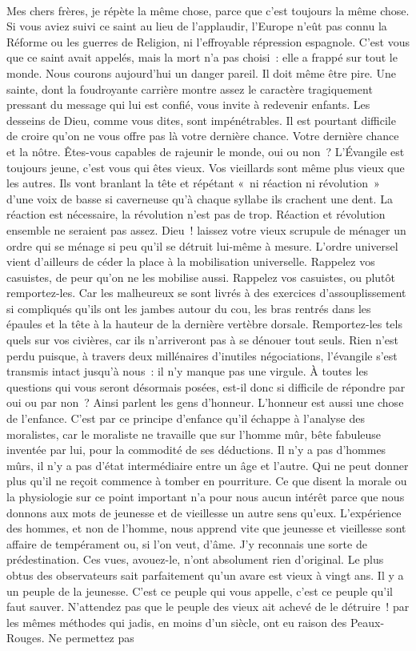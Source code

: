 \documentclass[french,twoside]{book} %
\begin{document}
\noindent  \par
Mes chers frères, je répète la même chose, parce que c’est toujours la même chose. Si vous aviez suivi ce saint au lieu de l’applaudir, l’Europe n’eût pas connu la Réforme ou les guerres de Religion, ni l’effroyable répression espagnole. C’est vous que ce saint avait appelés, mais la mort n’a pas choisi : elle a frappé sur tout le monde. Nous courons aujourd’hui un danger pareil. Il doit même être pire. Une sainte, dont la foudroyante carrière montre assez le caractère tragiquement pressant du message qui lui est confié, vous invite à redevenir enfants. Les desseins de Dieu, comme vous dites, sont impénétrables. Il est pourtant difficile de croire qu’on ne vous offre pas là votre dernière chance. Votre dernière chance et la nôtre. Êtes-vous capables de rajeunir le monde, oui ou non ? L’Évangile est toujours jeune, c’est vous qui êtes vieux. Vos vieillards sont même plus vieux que les autres. Ils vont branlant la tête et répétant « ni réaction ni révolution » d’une voix de basse si caverneuse qu’à chaque syllabe ils crachent une dent. La réaction est nécessaire, la révolution n’est pas de trop. Réaction et révolution ensemble ne seraient pas assez. Dieu ! laissez votre vieux scrupule de ménager un ordre qui se ménage si peu qu’il se détruit lui-même à mesure. L’ordre universel vient d’ailleurs de céder la place à la mobilisation universelle. Rappelez vos casuistes, de peur qu’on ne les mobilise aussi. Rappelez vos casuistes, ou plutôt remportez-les. Car les malheureux se sont livrés à des exercices d’assouplissement si compliqués qu’ils ont les jambes autour du cou, les bras rentrés dans les épaules et la tête à la hauteur de la dernière vertèbre dorsale. Remportez-les tels quels sur vos civières, car ils n’arriveront pas à se dénouer tout seuls. Rien n’est perdu puisque, à travers deux millénaires d’inutiles négociations, l’évangile s’est transmis intact jusqu’à nous : il n’y manque pas une virgule. À toutes les questions qui vous seront désormais posées, est-il donc si difficile de répondre par oui ou par non ? Ainsi parlent les gens d’honneur. L’honneur est aussi une chose de l’enfance. C’est par ce principe d’enfance qu’il échappe à l’analyse des moralistes, car le moraliste ne travaille que sur l’homme mûr, bête fabuleuse inventée par lui, pour la commodité de ses déductions. Il n’y a pas d’hommes mûrs, il n’y a pas d’état intermédiaire entre un âge et l’autre. Qui ne peut donner plus qu’il ne reçoit commence à tomber en pourriture. Ce que disent la morale ou la physiologie sur ce point important n’a pour nous aucun intérêt parce que nous donnons aux mots de jeunesse et de vieillesse un autre sens qu’eux. L’expérience des hommes, et non de l’homme, nous apprend vite que jeunesse et vieillesse sont affaire de tempérament ou, si l’on veut, d’âme. J’y reconnais une sorte de prédestination. Ces vues, avouez-le, n’ont absolument rien d’original. Le plus obtus des observateurs sait parfaitement qu’un avare est vieux à vingt ans. Il y a un peuple de la jeunesse. C’est ce peuple qui vous appelle, c’est ce peuple qu’il faut sauver. N’attendez pas que le peuple des vieux ait achevé de le détruire ! par les mêmes méthodes qui jadis, en moins d’un siècle, ont eu raison des Peaux-Rouges. Ne permettez pas 
\end{document}
